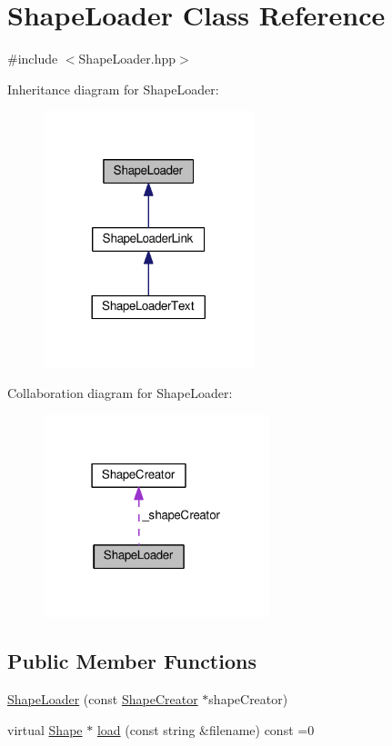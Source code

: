 \hypertarget{class_shape_loader}{}\section{Shape\+Loader Class Reference}
\label{class_shape_loader}


{\ttfamily \#include $<$Shape\+Loader.\+hpp$>$}



Inheritance diagram for Shape\+Loader\+:\nopagebreak
\begin{figure}[H]
\begin{center}
\leavevmode
\includegraphics[width=173pt]{class_shape_loader__inherit__graph}
\end{center}
\end{figure}


Collaboration diagram for Shape\+Loader\+:\nopagebreak
\begin{figure}[H]
\begin{center}
\leavevmode
\includegraphics[width=186pt]{class_shape_loader__coll__graph}
\end{center}
\end{figure}
\subsection*{Public Member Functions}
\begin{DoxyCompactItemize}
\item 
\hyperlink{class_shape_loader_a648a5e0abfda168281769ae2c68e1d0b}{Shape\+Loader} (const \hyperlink{class_shape_creator}{Shape\+Creator} $\ast$shape\+Creator)
\item 
virtual \hyperlink{class_shape}{Shape} $\ast$ \hyperlink{class_shape_loader_af675cfe98578da47d31c54a3ea3748e1}{load} (const string \&filename) const =0
\end{DoxyCompactItemize}
